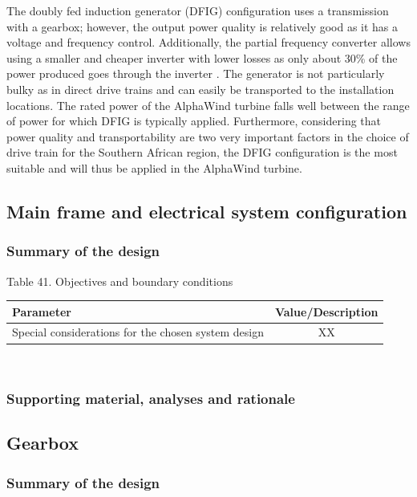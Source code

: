 The doubly fed induction generator (DFIG) configuration uses a transmission with a gearbox; however, the output power quality is relatively good as it has a voltage and frequency control. Additionally, the partial frequency converter allows using a smaller and cheaper inverter with lower losses as only about 30\% of the power produced goes through the inverter \cite{hau}. The generator is not particularly bulky as in direct drive trains and can easily be transported to the installation locations. The rated power of the AlphaWind turbine falls well between the range of power for which DFIG is typically applied. Furthermore, considering that power quality and transportability are two very important factors in the choice of drive train for the Southern African region, the DFIG configuration is the most suitable and will thus be applied in the AlphaWind turbine.


\subsection{Main frame and electrical system configuration}

\subsubsection{Summary of the design}


\begin{center}
Table 41. Objectives and boundary conditions\\
\begin{tabular}{ |l|c| } 
\hline
\textbf{Parameter} & \textbf{Value/Description}  \\ 
\hline
Special considerations for the chosen system design & XX  \\ 
\hline
\end{tabular} \\
\end{center}


\subsubsection{Supporting material, analyses and rationale}

\newpage

\subsection{Gearbox}

\subsubsection{Summary of the design}

